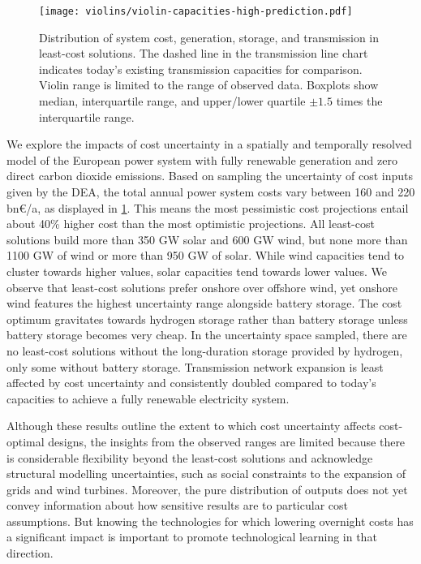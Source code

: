 
\begin{figure}
    \centering
    \texttt{[image: violins/violin-capacities-high-prediction.pdf]}
    \caption{ Distribution of system cost, generation, storage, and transmission
      in least-cost solutions. The dashed line in the transmission line chart
      indicates today's existing transmission capacities for comparison. Violin
      range is limited to the range of observed data. Boxplots show median,
      interquartile range, and upper/lower quartile $\pm 1.5$ times the
      interquartile range. }
    \label{fig:violin}
\end{figure}

We explore the impacts of cost uncertainty in a spatially and temporally
resolved model of the European power system with fully renewable generation and
zero direct carbon dioxide emissions. Based on sampling the uncertainty of cost
inputs given by the DEA,\cite{DEA} the total annual power system costs vary
between 160 and 220 bn\euro/a, as displayed in \cref{fig:violin}. This means the
most pessimistic cost projections entail about 40\% higher cost than the most
optimistic projections. All least-cost solutions build more than 350 GW solar
and 600 GW wind, but none more than 1100 GW of wind or more than 950 GW of
solar. While wind capacities tend to cluster towards higher values, solar
capacities tend towards lower values. We observe that least-cost solutions
prefer onshore over offshore wind, yet onshore wind features the highest
uncertainty range alongside battery storage. The cost optimum gravitates towards
hydrogen storage rather than battery storage unless battery storage becomes very
cheap. In the uncertainty space sampled, there are no least-cost solutions
without the long-duration storage provided by hydrogen, only some without
battery storage. Transmission network expansion is least affected by cost
uncertainty and consistently doubled compared to today's capacities to achieve a
fully renewable electricity system.

Although these results outline the extent to which cost uncertainty affects
cost-optimal designs, the insights from the observed ranges are limited because
there is considerable flexibility beyond the least-cost solutions and
acknowledge structural modelling uncertainties, such as social constraints to
the expansion of grids and wind turbines. Moreover, the pure distribution of
outputs does not yet convey information about how sensitive results are to
particular cost assumptions. But knowing the technologies for which lowering
overnight costs has a significant impact is important to promote technological
learning in that direction.


